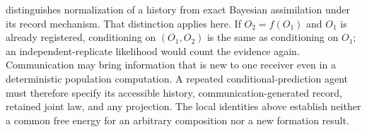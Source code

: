  distinguishes normalization of a history from exact Bayesian assimilation under its record mechanism. That distinction applies here. If $O_2=f(O_1)$ and $O_1$ is already registered, conditioning on $(O_1,O_2)$ is the same as conditioning on $O_1$; an independent-replicate likelihood would count the evidence again. Communication may bring information that is new to one receiver even in a deterministic population computation. A repeated conditional-prediction agent must therefore specify its accessible history, communication-generated record, retained joint law, and any projection. The local identities above establish neither a common free energy for an arbitrary composition nor a new formation result.
